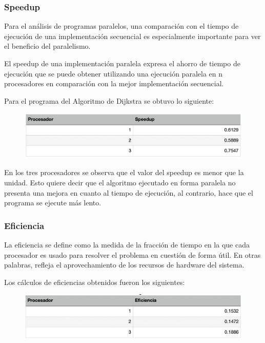 \documentclass[11pt]{article}
\begin{document}
\subsubsection{Speedup}
Para el análisis de programas paralelos, una comparación con el tiempo de ejecución de una implementación secuencial es especialmente importante para ver el beneficio del paralelismo.
\par
El speedup de una implementación paralela expresa el ahorro de tiempo de ejecución que se puede obtener utilizando una ejecución paralela en n procesadores en comparación con la mejor implementación secuencial.
\par
Para el programa del Algoritmo de Dijkstra se obtuvo lo siguiente:

\begin{figure}[!htbp]
\centering
\includegraphics[scale = .5]{speedup}
\end{figure}

En los tres procesadores se observa que el valor del speedup es menor que la unidad. Esto quiere decir que el algoritmo ejecutado en forma paralela no presenta una mejora en cuanto al tiempo de ejecución, al contrario, hace que el programa se ejecute más lento.

\subsubsection{Eficiencia}
La eficiencia se define como la medida de la fracción de tiempo en la que cada procesador es usado para resolver el problema en cuestión de forma útil. En otras palabras, refleja el aprovechamiento de los recursos de hardware del sistema.
\par
Los cálculos de eficiencias obtenidos fueron los siguientes:

\begin{figure}[!htbp]
\centering
\includegraphics[scale = .5]{eficiencia}
\end{figure}
\end{document}
